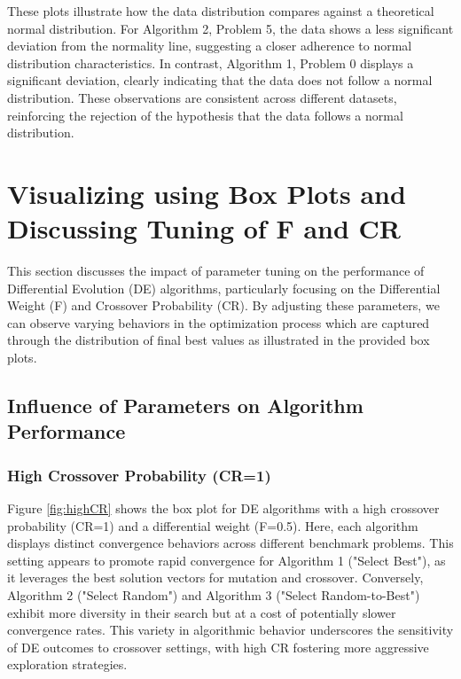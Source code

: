 \documentclass[12pt,a4paper]{article}
\begin{document}
These plots illustrate how the data distribution compares against a theoretical normal distribution. For Algorithm 2, Problem 5, the data shows a less significant deviation from the normality line, suggesting a closer adherence to normal distribution characteristics. In contrast, Algorithm 1, Problem 0 displays a significant deviation, clearly indicating that the data does not follow a normal distribution. These observations are consistent across different datasets, reinforcing the rejection of the hypothesis that the data follows a normal distribution.

\newpage

\section{Visualizing using Box Plots and Discussing Tuning of F and CR}
\label{sec:visualization}

This section discusses the impact of parameter tuning on the performance of Differential Evolution (DE) algorithms, particularly focusing on the Differential Weight (F) and Crossover Probability (CR). By adjusting these parameters, we can observe varying behaviors in the optimization process which are captured through the distribution of final best values as illustrated in the provided box plots.

\subsection{Influence of Parameters on Algorithm Performance}

\subsubsection{High Crossover Probability (CR=1)}
Figure \ref{fig:highCR} shows the box plot for DE algorithms with a high crossover probability (CR=1) and a differential weight (F=0.5). Here, each algorithm displays distinct convergence behaviors across different benchmark problems. This setting appears to promote rapid convergence for Algorithm 1 ("Select Best"), as it leverages the best solution vectors for mutation and crossover. Conversely, Algorithm 2 ("Select Random") and Algorithm 3 ("Select Random-to-Best") exhibit more diversity in their search but at a cost of potentially slower convergence rates. This variety in algorithmic behavior underscores the sensitivity of DE outcomes to crossover settings, with high CR fostering more aggressive exploration strategies.
\end{document}
